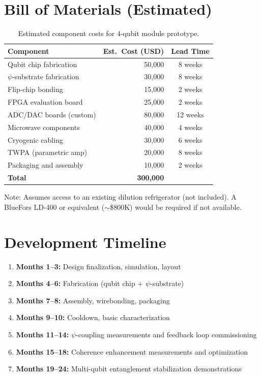 \documentclass[11pt,letterpaper]{article}
\begin{document}
\section{Bill of Materials (Estimated)}

\begin{table}[H]
\caption{Estimated component costs for 4-qubit module prototype.}
\begin{tabular}{lrc}
\toprule
\textbf{Component} & \textbf{Est.\ Cost (USD)} & \textbf{Lead Time} \\
\midrule
Qubit chip fabrication & 50,000 & 8 weeks \\
$\psi$-substrate fabrication & 30,000 & 8 weeks \\
Flip-chip bonding & 15,000 & 2 weeks \\
FPGA evaluation board & 25,000 & 2 weeks \\
ADC/DAC boards (custom) & 80,000 & 12 weeks \\
Microwave components & 40,000 & 4 weeks \\
Cryogenic cabling & 30,000 & 6 weeks \\
TWPA (parametric amp) & 20,000 & 8 weeks \\
Packaging and assembly & 10,000 & 2 weeks \\
\midrule
\textbf{Total} & \textbf{300,000} & \\
\bottomrule
\end{tabular}
\end{table}

Note: Assumes access to an existing dilution refrigerator (not included).
A BlueFors LD-400 or equivalent ($\sim$\$800K) would be required if not
available.

\section{Development Timeline}

\begin{enumerate}
\item \textbf{Months 1--3:} Design finalization, simulation, layout
\item \textbf{Months 4--6:} Fabrication (qubit chip + $\psi$-substrate)
\item \textbf{Months 7--8:} Assembly, wirebonding, packaging
\item \textbf{Months 9--10:} Cooldown, basic characterization
\item \textbf{Months 11--14:} $\psi$-coupling measurements and feedback
loop commissioning
\item \textbf{Months 15--18:} Coherence enhancement measurements and
optimization
\item \textbf{Months 19--24:} Multi-qubit entanglement stabilization
demonstrations
\end{enumerate}
\end{document}
